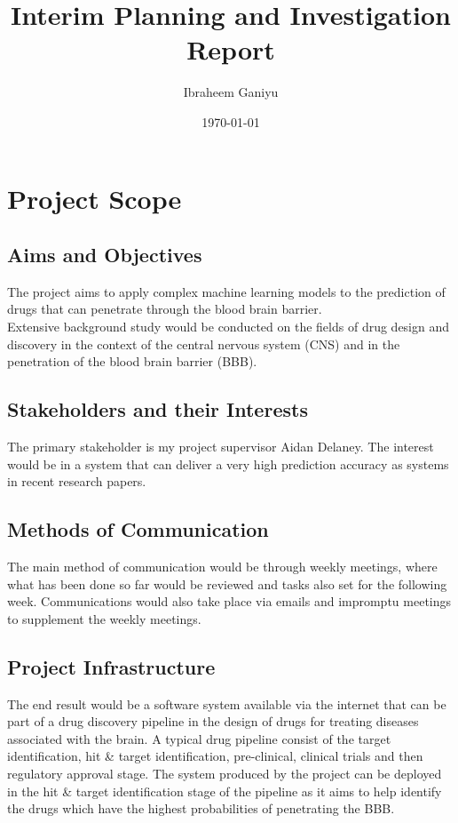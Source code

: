 \documentclass[a4paper,12pt]{article}
\begin{document}
	\begin{titlepage}
		\title{Interim Planning and Investigation Report}
		\date{\today}
		\author{Ibraheem Ganiyu}
	\end{titlepage}
	\maketitle
	
	\tableofcontents
	\newpage
	\listoffigures
	\listoftables
	\newpage
	
	\section{Project Scope}
		\subsection{Aims and Objectives}
		The project aims to apply complex machine learning models to the prediction of drugs that can penetrate through the blood brain barrier. \\
		Extensive background study would be conducted on the fields of drug design and discovery in the context of the central nervous system (CNS) and in the penetration of the blood brain barrier (BBB). 
		\subsection{Stakeholders and their Interests}
		The primary stakeholder is my project supervisor Aidan Delaney. The interest would be in a system that can deliver a very high prediction accuracy as systems in recent research papers.
		\subsection{Methods of Communication}
		The main method of communication would be through weekly meetings, where what has been done so far would be reviewed and tasks also set for the following week. Communications would also take place via emails and impromptu meetings to supplement the weekly meetings.
		\subsection{Project Infrastructure}
		The end result would be a software system available via the internet that can be part of a drug discovery pipeline in the design of drugs for treating diseases associated with the brain. A typical drug pipeline consist of the target identification, hit \& target identification, pre-clinical, clinical trials and then regulatory approval stage. The system produced by the project can be deployed in the hit \& target identification stage of the pipeline as it aims to help identify the drugs which have the highest probabilities of penetrating the BBB. 
\end{document}
